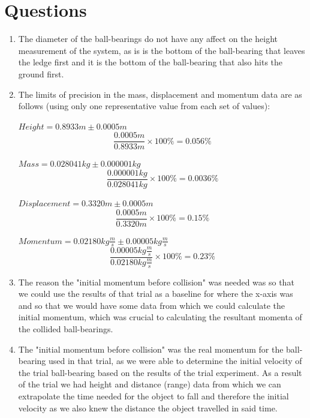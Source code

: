 \documentclass[12pt]{article}
\begin{document}
\section{Questions}
\begin{enumerate}

\item{
The diameter of the ball-bearings do not have any affect on the height measurement of the system, as is is the bottom of the ball-bearing that leaves the ledge first and it is the bottom of the ball-bearing that also hits the ground first.}

\item{
The limits of precision in the mass, displacement and momentum data are as follows (using only one representative value from each set of values):

$Height=0.8933m\pm0.0005m$\newline
\begin{equation}
\frac{0.0005m}{0.8933m}\times 100\%=0.056\%
\end{equation}

$Mass=0.028041kg\pm0.000001kg$\newline
\begin{equation}
\frac{0.000001kg}{0.028041kg}\times 100\%=0.0036\%
\end{equation}

$Displacement=0.3320m\pm0.0005m$\newline
\begin{equation}
\frac{0.0005m}{0.3320m}\times 100\%=0.15\%
\end{equation}

$Momentum=0.02180kg\frac{m}{s}\pm0.00005kg\frac{m}{s}$\newline
\begin{equation}
\frac{0.00005kg\frac{m}{s}}{0.02180kg\frac{m}{s}}\times 100\%=0.23\%
\end{equation}}
\pagebreak
\space
\newline

\item{
The reason the "initial momentum before collision" was needed was so that we could use the results of that trial as a baseline for where the x-axis was and so that we would have some data from which we could calculate the initial momentum, which was crucial to calculating the resultant momenta of the collided ball-bearings.}

\item{
The "initial momentum before collision" was the real momentum for the ball-bearing used in that trial, as we were able to determine the initial velocity of the trial ball-bearing based on the results of the trial experiment. As a result of the trial we had height and distance (range) data from which we can extrapolate the time needed for the object to fall and therefore the initial velocity as we also knew the distance the object travelled in said time.}


\end{enumerate}
\end{document}

